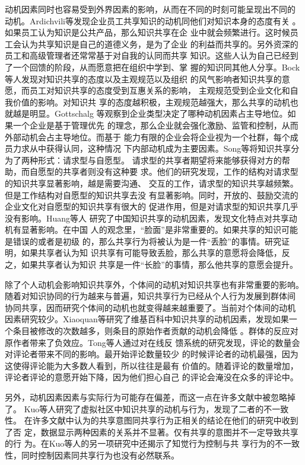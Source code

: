 \documentclass[12pt,a4paper]{ctexart}
\begin{document}
动机因素同时也容易受到外界因素的影响，从而在不同的时刻可能呈现出不同的
动机。Ardichvili等发现企业员工共享知识的动机同他们对知识本身的态度有关
\cite{ardichvili2003mab}。如果员工认为知识是公共产品，那么知识共享在企
业中就会频繁进行。这时候员工会认为共享知识是自己的道德义务，是为了企业
的利益而共享的。另外资深的员工和高级管理者还常常基于对自我的认同而共享
知识。这些人认为自己已经到了一个回馈的阶段，从而愿意把在组织中学到、掌
握的知识同其他人分享。Bock等人发现对知识共享的态度以及主观规范以及组织
的风气影响者知识共享的意愿，而员工对知识共享的态度受到互惠关系的影响，
主观规范受到企业文化和自我价值的影响\cite{1631336620050301}。对知识共
享的态度越积极，主观规范越强大，那么共享的动机也就越是明显。Gottschalg
等观察到企业类型决定了哪种动机因素占主导地位\cite{Gottschalg2006}。如果一个企业是基于管理优先
的理念，那么企业就会强化激励、监管和控制，从而外部动机会占主导地位。而基于
能力有限的企业会将企业视为一个社群，每个成员力求从中获得认同，这种情况
下内部动机成为主要因素。Song等将知识共享分为了两种形式：请求型与自愿型。
请求型的共享者期望将来能够获得对方的帮助，而自愿型的共享者则没有这种要
求。他们的研究发现，工作的结构对请求型的知识共享显著影响，越是需要沟通、
交互的工作，请求型的知识共享越频繁。但是工作结构对自愿型的知识共享去没
有显著影响。同时，开放的、鼓励交流的企业文化对自愿型的知识共享有很大的
促进作用，但是对请求型的知识共享几乎没有影响\cite{4439047}。Huang等人
研究了中国知识共享的动机因素，发现文化特点对共享动机有显著影响。在中国
人的观念里，“脸面”是非常重要的。如果共享的知识可能是错误的或者是初级
的，那么共享行为将被认为是一件“丢脸”的事情。研究证明，如果共享者认为知
识共享有可能导致丢脸，那么共享的意愿将会降低，反之，如果共享者认为知识
共享是一件“长脸”的事情，那么他共享的意愿会提升\cite{huang2008ipa}。

除了个人动机会影响知识共享外，个体间的动机对知识共享也有非常重要的影响。
随着对知识协同的行为越来与普遍，知识共享行为已经从个人行为发展到群体间
协同共享，因而研究个体间的动机也就变得越来越重要了。当前对个体间的动机
因素研究较少。Xiaoquan等研究了维基百科中知识共享的动机因素，发现如果一
个条目被修改的次数越多，则条目的原始作者贡献的动机会降低
\cite{Zhang2006}。群体的反应对原作者带来了负效应。Tong等人通过对在线反
馈系统的研究发现，评论的数量会对评论者带来不同的影响。最开始评论数量较少
的时候评论者的动机最强，因为这使得评论能为大多数人看到，所以往往是最有
价值的。随着评论的数量增加，评论者评论的意愿开始下降，因为他们担心自己
的评论会淹没在众多的评论中\cite{tong2007uii}。

另外，动机因素因素与实际行为可能存在偏差，而这一点在许多文献中被忽略掉
了。 Kuo等人研究了虚拟社区中知识共享的动机与行为，发现了二者的不一致性。
在许多文献中认为的共享意图同共享行为正相关的结论在他们的研究中收到了否
定，数据显示两种因素的关系并不显著。仅有共享的意图并不一定导致共享的行
为\cite{Kuowiley2008}。在Kuo等人的另一项研究中还揭示了知觉行为控制与共
享行为的不一致性，同时控制因素同共享行为也没有必然联系\cite{Kuo2008}。
\end{document}
